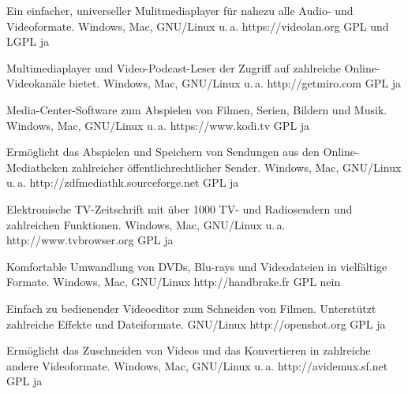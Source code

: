




{Ein einfacher, universeller Mulitmediaplayer für nahezu alle Audio- und Videoformate.}
{Windows, Mac, GNU/Linux u.\,a.}
{https://videolan.org}
{GPL und LGPL}
{ja}

{Multimediaplayer und Video-Podcast-Leser der Zugriff auf zahlreiche Online-Videokanäle bietet.}
{Windows, Mac, GNU/Linux u.\,a.}
{http://getmiro.com}
{GPL}
{ja}

{Media-Center-Software zum Abspielen von Filmen, Serien, Bildern und Musik.}
{Windows, Mac, GNU/Linux u.\,a.}
{https://www.kodi.tv}
{GPL}
{ja}

{Ermöglicht das Abspielen und Speichern von Sendungen aus den Online-Mediatheken zahlreicher öffentlichrechtlicher Sender.}
{Windows, Mac, GNU/Linux u.\,a.}
{http://zdfmediathk.sourceforge.net}
{GPL}
{ja}


{Elektronische TV-Zeitschrift mit über 1000 TV- und Radiosendern und zahlreichen Funktionen.}
{Windows, Mac, GNU/Linux u.\,a.}
{http://www.tvbrowser.org}
{GPL}
{ja}

{Komfortable Umwandlung von DVDs, Blu-rays und Videodateien in vielfältige Formate.}
{Windows, Mac, GNU/Linux}
{http://handbrake.fr}
{GPL}
{nein}

{Einfach zu bedienender Videoeditor zum Schneiden von Filmen. Unterstützt zahlreiche Effekte und Dateiformate.}
{GNU/Linux}
{http://openshot.org}
{GPL}
{ja}

{Ermöglicht das Zuschneiden von Videos und das Konvertieren in zahlreiche andere Videoformate.}
{Windows, Mac, GNU/Linux u.\,a.}
{http://avidemux.sf.net}
{GPL}
{ja}

\backpage

